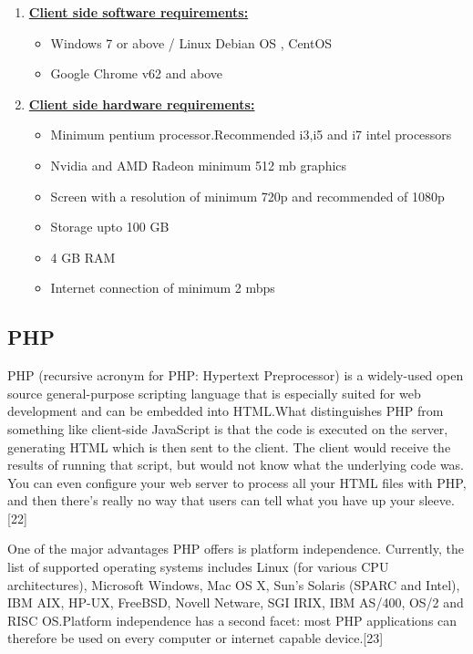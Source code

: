 \documentclass[a4paper,12pt]{report}
\begin{document}
\begin{enumerate}
    \item \textbf{\underline{Client side software requirements:}}
         \begin{itemize}
            \item Windows 7 or above / Linux Debian OS , CentOS
            \item Google Chrome v62 and above
        \end{itemize}

    \item \textbf{\underline{Client side hardware requirements:}}
        \begin{itemize}
            \item Minimum pentium processor.Recommended i3,i5 and i7 intel processors
            \item Nvidia and AMD Radeon minimum 512 mb graphics
            \item Screen with a resolution of minimum 720p and recommended of 1080p
            \item Storage upto 100 GB
            \item 4 GB RAM
            \item Internet connection of minimum 2 mbps
        \end{itemize}

\end{enumerate}


\subsection{PHP}

\par PHP (recursive acronym for PHP: Hypertext Preprocessor) is a widely-used open source general-purpose scripting language that is especially suited for web development and can be embedded into HTML.What distinguishes PHP from something like client-side JavaScript is that the code is executed on the server, generating HTML which is then sent to the client. The client would receive the results of running that script, but would not know what the underlying code was. You can even configure your web server to process all your HTML files with PHP, and then there's really no way that users can tell what you have up your sleeve.[22]\\

\par One of the major advantages PHP offers is platform independence.
Currently, the list of supported operating systems includes Linux
(for various CPU architectures), Microsoft Windows, Mac OS X,
Sun's Solaris (SPARC and Intel), IBM AIX, HP-UX, FreeBSD, Novell
Netware, SGI IRIX, IBM AS/400, OS/2 and RISC OS.Platform independence has a
second facet: most PHP applications can therefore be used on
every computer or internet capable device.[23]\\
\end{document}
